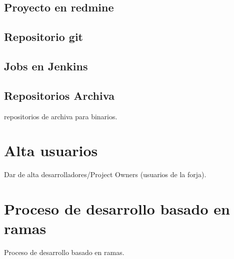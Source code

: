 \subsection{Proyecto en redmine}
\label{sub:proyeto-redmine}


\subsection{Repositorio git}
\label{sub:repo-git}


\subsection{Jobs en Jenkins}
\label{sub:jobs-jenkins}



\subsection{Repositorios Archiva}
\label{sub:archiva}

\par repositorios de archiva para binarios.


\section{Alta usuarios}
\label{sec:alta-usuarios}

\par Dar de alta desarrolladores/Project Owners (usuarios de la forja).


\section{Proceso de desarrollo basado en ramas}
\label{sec:desarrollo-en-ramas}

\par Proceso de desarrollo basado en ramas.


